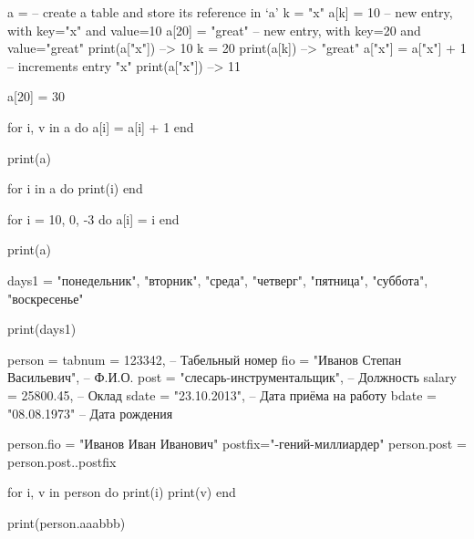 a = {}     -- create a table and store its reference in `a'
k = "x"
a[k] = 10        -- new entry, with key="x" and value=10
a[20] = "great"  -- new entry, with key=20 and value="great"
print(a["x"])    --> 10
k = 20
print(a[k])      --> "great"
a["x"] = a["x"] + 1     -- increments entry "x"
print(a["x"])    --> 11

a[20] = 30

for i, v in a do
    a[i] = a[i] + 1
end

print(a)

for i in a do
    print(i)
end

for i = 10, 0, -3 do
    a[i] = i
end

print(a)

days1 = {"понедельник", "вторник", "среда", "четверг", "пятница", "суббота", "воскресенье"}

print(days1)

person = {tabnum = 123342,                   -- Табельный номер
          fio = "Иванов Степан Васильевич",  -- Ф.И.О.
          post = "слесарь-инструментальщик", -- Должность
          salary = 25800.45,                 -- Оклад
          sdate = "23.10.2013",              -- Дата приёма на работу
          bdate = "08.08.1973"}              -- Дата рождения 

person.fio = "Иванов Иван Иванович"
postfix="-гений-миллиардер"
person.post = person.post..postfix

for i, v in person do
    print(i)
    print(v)
end

print(person.aaabbb)